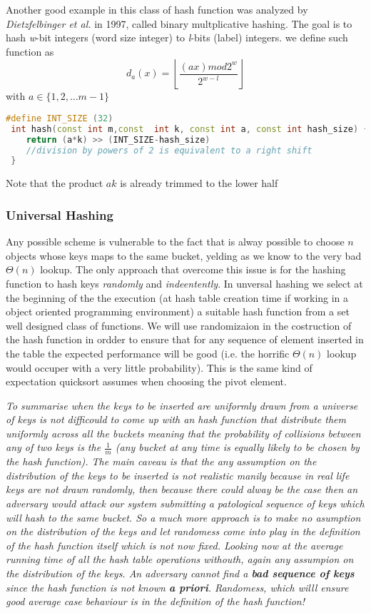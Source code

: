 Another good example in this class of hash function was analyzed by \textit{Dietzfelbinger et al.} in 1997, called binary multplicative hashing. The goal is to hash \textit{w}-bit integers (word size integer) to \textit{l}-bits (label) integers. 
we define such function as 
\[
d_a (x) = \left \lfloor{\frac{(ax) mod 2^w}{2^{w-l}}}\right \rfloor 
\]
with $a \in \{1,2,\ldots m-1\}$

\begin{lstlisting}[language=c++, caption="Store credit c++ solution"]
#define INT_SIZE (32)
 int hash(const int m,const  int k, const int a, const int hash_size) {
 	return (a*k) >> (INT_SIZE-hash_size) 
 	//division by powers of 2 is equivalent to a right shift
 }

\end{lstlisting}
Note that the product $ak$ is already trimmed to the lower half
\subsubsection{Universal Hashing}

Any possible scheme is vulnerable to the fact that is alway possible to choose $n$ objects whose keys maps to the same bucket, yelding as we know to the very bad $\Theta(n)$ lookup. The only approach that overcome this issue is for the hashing function to hash keys \textit{randomly} and \textit{indeentently}. In unversal hashing we select at the beginning of the the execution (at hash table  creation time if working in a object oriented programming environment) a suitable hash function from a set well designed class of functions. We will use randomizaion in the costruction of the hash function in ordder to ensure that for any sequence of element inserted in the table the expected performance will be good (i.e. the horrific $\Theta(n)$ lookup would occuper with a very little probability). This is the same kind of expectation quicksort assumes when choosing the pivot element.

\textit{To summarise when the keys to be inserted are uniformly drawn from a universe of keys is not difficould to come up with an hash function that distribute them uniformly across all the buckets meaning that the probability of collisions between any of two keys is the $\frac{1}{m}$ (any bucket at any time is equally likely to be chosen by the hash function). The main caveau is that the any assumption on the distribution of the keys to be inserted is not realistic manily because in real life keys are not drawn randomly, then because there could alway be the case then an adversary would attack our system submitting a patological sequence of keys which will hash to the same bucket. So a much more approach is to  make no asumption on the distribution of the keys and let randomess come into play in the definition of the hash function itself which is not now fixed. Looking now at the average running time of all the hash table operations withouth, again any assumpion on the distribution of the keys. An adversary cannot find a \textbf{bad sequence of keys} since the hash function is not known \textbf{a priori}. Randomess, which willl ensure good average case behaviour is in the definition of the hash function!} 

